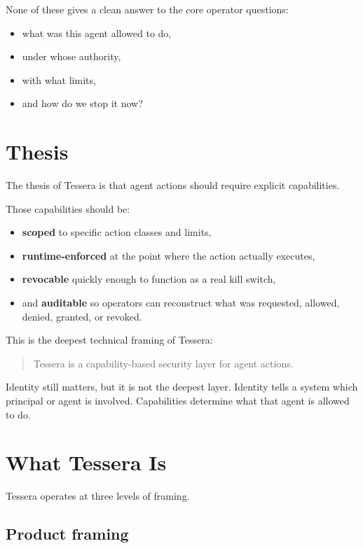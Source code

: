 \documentclass[11pt, a4paper]{article}
\begin{document}
None of these gives a clean answer to the core operator questions:

\begin{itemize}
  \item what was this agent allowed to do,
  \item under whose authority,
  \item with what limits,
  \item and how do we stop it now?
\end{itemize}

\section{Thesis}

The thesis of Tessera is that agent actions should require explicit capabilities.

Those capabilities should be:

\begin{itemize}
  \item \textbf{scoped} to specific action classes and limits,
  \item \textbf{runtime-enforced} at the point where the action actually executes,
  \item \textbf{revocable} quickly enough to function as a real kill switch,
  \item and \textbf{auditable} so operators can reconstruct what was requested, allowed, denied, granted, or revoked.
\end{itemize}

This is the deepest technical framing of Tessera:

\begin{quote}
Tessera is a capability-based security layer for agent actions.
\end{quote}

Identity still matters, but it is not the deepest layer. Identity tells a system which principal or agent is involved. Capabilities determine what that agent is allowed to do.

\section{What Tessera Is}

Tessera operates at three levels of framing.

\subsection{Product framing}
\end{document}

